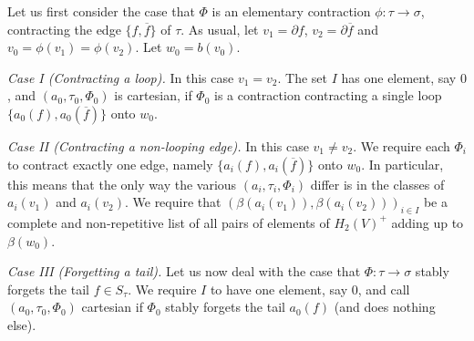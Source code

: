 \documentclass[11pt]{amsart}
\theoremstyle{definition}
\theoremstyle{remark}
\newcommand{\del}{\partial}
\newcommand{\ol}{\overline}
\renewcommand{\t}{_{\tau}}
\theoremstyle{plain}
\theoremstyle{definition}
\theoremstyle{remark}
\begin{document}
Let us first consider the case that \(\Phi\) is an elementary contraction
\(\phi:\tau\rightarrow\sigma\), contracting the
edge \(\{f,\ol{f}\}\) of \(\tau\). As usual, let \(v_1=\del f\), \(v_2=\del\ol{f}\) and
\(v_0=\phi(v_1)=\phi(v_2)\). Let
\(w_0=b(v_0)\).

{\em Case I (Contracting a loop). } In this case \(v_1=v_2\). The set \(I\) has one
element, say \(0\), and
\((a_0,\tau_0,\Phi_0)\) is cartesian, if \(\Phi_0\) is a contraction contracting a
single loop \(\{a_0(f),a_0(\ol{f})\}\) onto
\(w_0\).

{\em Case II (Contracting a non-looping edge). } In this case \(v_1\not=v_2\). We
require each \(\Phi_i\) to contract
exactly one edge, namely \(\{a_i(f),a_i(\ol{f})\}\) onto \(w_0\). In particular,
this means that the only way the various
\((a_i,\tau_i,\Phi_i)\) differ is in the classes of \(a_i(v_1)\) and \(a_i(v_2)\). We
require that
\((\beta(a_i(v_1)),\beta(a_i(v_2)))_{i\in I}\) be a complete and non-repetitive
list of all pairs of elements of
\(H_2(V)^+\) adding up to \(\beta(w_0)\).

{\em Case III (Forgetting a tail). } Let us now deal with the case that
\(\Phi:\tau\rightarrow\sigma\) stably forgets the
tail \(f\in S\t\). We require \(I\) to have one element, say \(0\), and call
\((a_0,\tau_0,\Phi_0)\) cartesian if \(\Phi_0\)
stably forgets the tail \(a_0(f)\) (and does nothing else).
\end{document}
